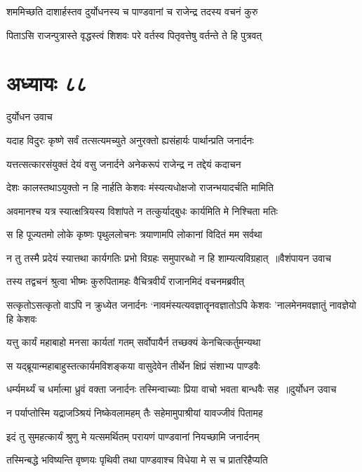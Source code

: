 \twolineshloka
{शममिच्छति दाशार्हस्तव दुर्योधनस्य च}
{पाण्डवानां च राजेन्द्र तदस्य वचनं कुरु}


\twolineshloka
{पिताऽसि राजन्पुत्रास्ते वृद्धस्त्वं शिशवः परे}
{वर्तस्व पितृवत्तेषु वर्तन्ते ते हि पुत्रवत्}


\chapter{अध्यायः ८८}
\twolineshloka
{दुर्योधन उवाच}
{}


\twolineshloka
{यदाह विदुरः कृष्णे सर्वं तत्सत्यमच्युते}
{अनुरक्तो ह्यसंहार्यः पार्थान्प्रति जनार्दनः}


\twolineshloka
{यत्तत्सत्कारसंयुक्तं देयं वसु जनार्दने}
{अनेकरूपं राजेन्द्र न तद्देयं कदाचन}


\twolineshloka
{देशः कालस्तथाऽयुक्तो न हि नार्हति केशवः}
{मंस्यत्यधोक्षजो राजन्भयादर्चति मामिति}


\twolineshloka
{अवमानश्च यत्र स्यात्क्षत्रियस्य विशांपते}
{न तत्कुर्याद्बुधः कार्यमिति मे निश्चिता मतिः}


\twolineshloka
{स हि पूज्यतमो लोके कृष्णः पृथुललोचनः}
{त्रयाणामपि लोकानां विदितं मम सर्वथा}


\threelineshloka
{न तु तस्मै प्रदेयं स्यात्तथा कार्यगतिः प्रभो}
{विग्रहः समुपारब्धो न हि शाम्यत्यविग्रहात् ॥वैशंपायन उवाच}
{}


\twolineshloka
{तस्य तद्वचनं श्रुत्वा भीष्मः कुरुपितामहः}
{वैचित्रवीर्यं राजानमिदं वचनमब्रवीत्}


\threelineshloka
{सत्कृतोऽसत्कृतो वाऽपि न क्रुध्येत जनार्दनः}
{`नावमंस्यत्यवज्ञातॄनवज्ञातोऽपि केशवः}
{'नालमेनमवज्ञातुं नावज्ञेयो हि केशवः}


\twolineshloka
{यत्तु कार्यं महाबाहो मनसा कार्यतां गतम्}
{सर्वोपायैर्न तच्छक्यं केनचित्कर्तुमन्यथा}


\twolineshloka
{स यद्ब्रूयान्महाबाहुस्तत्कार्यमविशङ्कया}
{वासुदेवेन तीर्थेन क्षिप्रं संशाभ्य पाण्डवैः}


\threelineshloka
{धर्म्यमर्थ्यं च धर्मात्मा ध्रुवं वक्ता जनार्दनः}
{तस्मिन्वाच्याः प्रिया वाचो भवता बान्धवैः सह ॥दुर्योधन उवाच}
{}


\twolineshloka
{न पर्याप्तोस्मि यद्राजञ्श्रियं निष्केवलामहम्}
{तैः सहेमामुपाश्रीयां यावज्जीवं पितामह}


\twolineshloka
{इदं तु सुमहत्कार्यं श्रुणु मे यत्समर्थितम्}
{परायणं पाण्डवानां नियच्छामि जनार्दनम्}


\twolineshloka
{तस्मिन्बद्धे भविष्यन्ति वृष्णयः पृथिवी तथा}
{पाण्डवाश्च विधेया मे स च प्रातरिहैप्यति}


